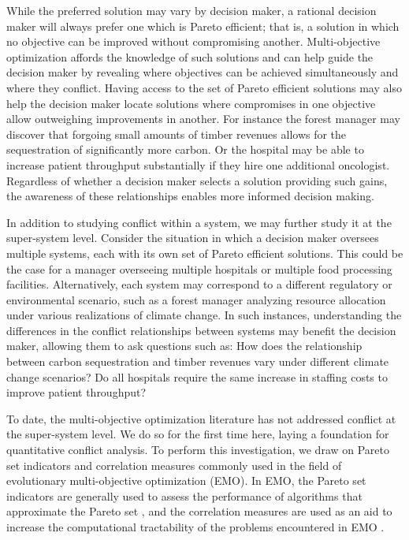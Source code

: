 While the preferred solution may vary by decision maker, a rational decision maker will always prefer one which is Pareto efficient; that is, a solution in which no objective can be improved without compromising another. Multi-objective optimization affords the knowledge of such solutions and can help guide the decision maker by revealing where objectives can be achieved simultaneously and where they conflict. Having access to the set of Pareto efficient solutions may also help the decision maker locate solutions where compromises in one objective allow outweighing improvements in another. For instance the forest manager may discover that forgoing small amounts of timber revenues allows for the sequestration of significantly more carbon. Or the hospital may be able to increase patient throughput substantially if they hire one additional oncologist.
Regardless of whether a decision maker selects a solution providing such gains, the awareness of these relationships enables more informed decision making.

In addition to studying conflict within a system, we may further study it at the super-system level. Consider the situation in which a decision maker oversees multiple systems, each with its own set of Pareto efficient solutions. This could be the case for a manager overseeing multiple hospitals or multiple food processing facilities. Alternatively, each system may correspond to a different regulatory or environmental scenario, such as a forest manager analyzing resource allocation under various realizations of climate change. In such instances, understanding the differences in the conflict relationships between systems may benefit the decision maker, allowing them to ask questions such as: How does the relationship between carbon sequestration and timber revenues vary under different climate change scenarios? Do all hospitals require the same increase in staffing costs to improve patient throughput?

To date, the multi-objective optimization literature has not addressed conflict at the super-system level. We do so for the first time here, laying a foundation for quantitative conflict analysis. To perform this investigation, we draw on Pareto set indicators and correlation measures commonly used in the field of evolutionary multi-objective optimization (EMO). In EMO, the Pareto set indicators are generally used to assess the performance of algorithms that approximate the Pareto set \cite{zitzler2003performance}, and the correlation measures are used as an aid to increase the computational tractability of the problems encountered in EMO \cite{brockhoff2006all}.

